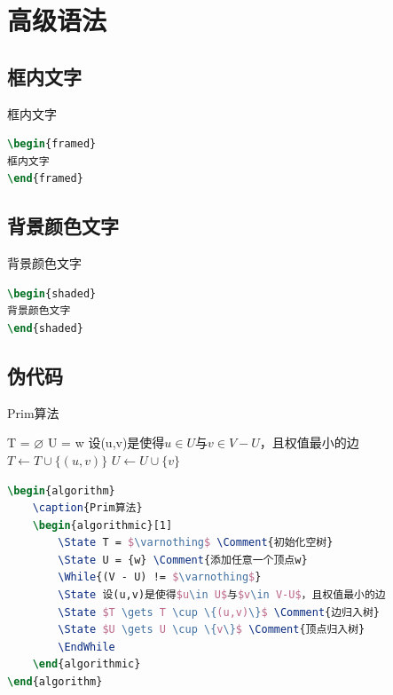 \chapter{高级语法}

\section{框内文字}

\begin{framed}
框内文字
\end{framed}

\begin{lstlisting}[language=tex]
\begin{framed}
框内文字
\end{framed}
\end{lstlisting}

\section{背景颜色文字}

\begin{shaded}
背景颜色文字
\end{shaded}

\begin{lstlisting}[language=tex]
\begin{shaded}
背景颜色文字
\end{shaded}
\end{lstlisting}

\section{伪代码}

\begin{algorithm}
	\caption{Prim算法}
	\begin{algorithmic}[1]
		\State T = $\varnothing$ 
		\State U = {w} 
		\State 设(u,v)是使得$u\in U$与$v\in V-U$，且权值最小的边
		\State $T \gets T \cup \{(u,v)\}$ 
		\State $U \gets U \cup \{v\}$ 
		\EndWhile
	\end{algorithmic}
\end{algorithm}

\begin{lstlisting}[language=tex]
\begin{algorithm}
	\caption{Prim算法}
	\begin{algorithmic}[1]
		\State T = $\varnothing$ \Comment{初始化空树}
		\State U = {w} \Comment{添加任意一个顶点w}
		\While{(V - U) != $\varnothing$}
		\State 设(u,v)是使得$u\in U$与$v\in V-U$，且权值最小的边
		\State $T \gets T \cup \{(u,v)\}$ \Comment{边归入树}
		\State $U \gets U \cup \{v\}$ \Comment{顶点归入树}
		\EndWhile
	\end{algorithmic}
\end{algorithm}
\end{lstlisting}

